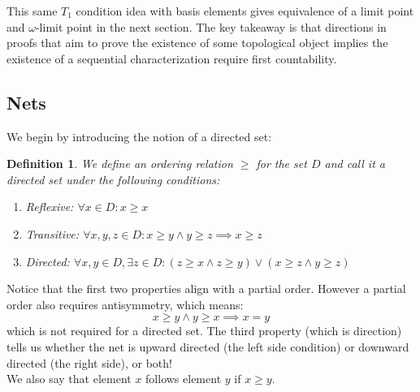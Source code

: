 \documentclass[10pt,letterpaper]{article} %
\newtheorem{defn}{Definition}[section]
\begin{document}
This same $T_1$ condition idea with basis elements gives equivalence of a limit point and $\omega$-limit point in the next section. The key takeaway is that directions in proofs that aim to prove the existence of some topological object implies the existence of a sequential characterization require first countability.\\
\subsection{Nets}
We begin by introducing the notion of a directed set:
\begin{defn}
We define an ordering relation $\geq$ for the set $D$ and call it a directed set under the following conditions:
\begin{enumerate}
\item Reflexive: $\forall x \in D: x \geq x$
\item Transitive: $\forall x, y, z \in D: x \geq y \land y \geq z \implies x \geq z$
\item Directed: $\forall x, y \in D, \exists z \in D: (z \geq x \land z \geq y) \lor (x \geq z \land y \geq z)$
\end{enumerate}
\end{defn}
Notice that the first two properties align with a partial order. However a partial order also requires antisymmetry, which means:
\begin{equation*}
x \geq y \land y \geq x \implies x = y
\end{equation*}
which is not required for a directed set. The third property (which is direction) tells us whether the net is upward directed (the left side condition) or downward directed (the right side), or both!\\

We also say that element $x$ follows element $y$ if $x \geq y$.\\
\end{document}
